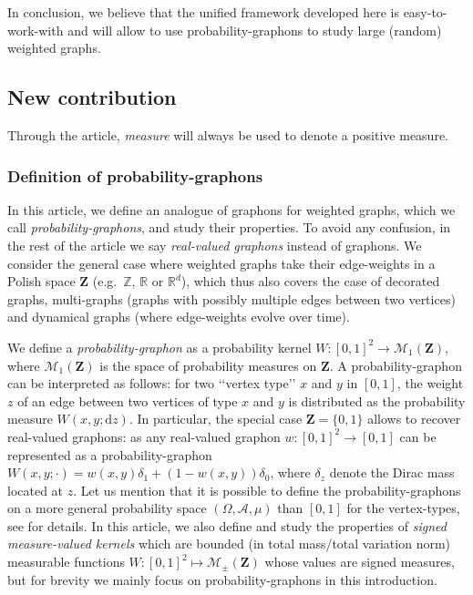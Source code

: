\documentclass{amsart}
\newcommand{\eg}{e.g.\ }
\theoremstyle{plain}
\theoremstyle{definition}
\newcommand{\Space}{\mathbf{Z}}
\newcommand{\cA}{\mathcal{A}}
\newcommand{\Proba}{\mathcal{M}_1(\Space)}
\newcommand{\SignedMeas}{\mathcal{M}_{\pm}(\Space)}
\newcommand{\Z}{\mathbb{Z}}
\newcommand{\R}{\mathbb{R}}
\newcommand{\drv}{\mathrm{d}}
\begin{document}
In conclusion, we believe that the unified framework developed here is
easy-to-work-with and will allow to use  probability-graphons to study
large (random) weighted  graphs. 
	


\subsection{New contribution}


Through the article, \emph{measure} will always be used to denote a positive measure.

\subsubsection{Definition of probability-graphons}

In this article, we define an analogue of graphons for weighted graphs,
	which we call \emph{probability-graphons}, and study their properties.
To avoid any confusion, in the rest of the article we say \emph{real-valued graphons}
	instead of graphons.
We consider the general case where weighted graphs take their edge-weights 
	in a Polish space $\Space$ (\eg $\Z$, $\R$ or $\R^d$),
	which thus also covers the case of decorated graphs,
		multi-graphs (graphs with possibly multiple edges between two vertices)
		and dynamical graphs (where edge-weights evolve over time). 
		

We define a \emph{probability-graphon} as a probability kernel $W : [0,1]^2 \to \Proba$,
	where $\Proba$ is the space of probability measures on $\Space$.
        A  probability-graphon can  be interpreted  as follows:  for two
        ‘‘vertex type’’  $x$ and $y$  in $[0,1]$,  the weight $z$  of an
        edge between two vertices of type  $x$ and $y$ is distributed as
        the  probability measure  $W(x,y;\drv z)$.   In particular,  the
        special case  $\Space =  \{0,1\}$ allows to  recover real-valued
        graphons: as any real-valued graphon $w : [0,1]^2 \to [0,1]$ can
        be       represented        as       a       probability-graphon
        $W(x,y;\cdot)  =  w(x,y)\delta_1  +  (1-w(x,y))\delta_0$,  where
        $\delta_z$ denote the Dirac mass located at $z$.  Let us mention
        that it is  possible to define the  probability-graphons on a
        more  general  probability  space   $(\Omega,  \cA,  \mu)$  than
        $[0,     1]$    for  the    vertex-types,     see
         for  details.  In this  article, we
        also   define  and   study   the   properties  of   \emph{signed
          measure-valued kernels} which are bounded (in total mass/total
        variation          norm)           measurable          functions
        $W  :  [0,1]^2  \mapsto  \SignedMeas$ whose  values  are  signed
        measures,    but    for    brevity   we    mainly    focus    on
        probability-graphons in this introduction.
\end{document}
